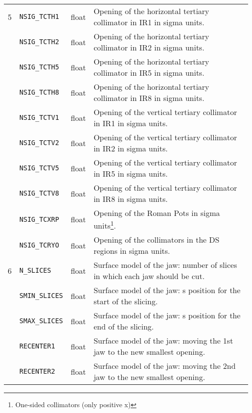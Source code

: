 \begin{center}
\begin{longtable}{| p{0.5cm} | p{2.4cm} | p{1.2cm} | >{\raggedright\arraybackslash}p{11.4cm}|}
    5   & \texttt{NSIG\_TCTH1}   & float   & Opening of the horizontal tertiary collimator in IR1 in sigma units\index{tertiary collimator}. \\
        \cline{2-4}
        & \texttt{NSIG\_TCTH2}   & float   & Opening of the horizontal tertiary collimator in IR2 in sigma units\index{tertiary collimator}. \\
        \cline{2-4}
        & \texttt{NSIG\_TCTH5}   & float   & Opening of the horizontal tertiary collimator in IR5 in sigma units\index{tertiary collimator}. \\
        \cline{2-4}
        & \texttt{NSIG\_TCTH8}   & float   & Opening of the horizontal tertiary collimator in IR8 in sigma units\index{tertiary collimator}. \\
        \cline{2-4}
        & \texttt{NSIG\_TCTV1}   & float   & Opening of the vertical tertiary collimator in IR1 in sigma units\index{tertiary collimator}. \\
        \cline{2-4}
        & \texttt{NSIG\_TCTV2}   & float   & Opening of the vertical tertiary collimator in IR2 in sigma units\index{tertiary collimator}. \\
        \cline{2-4}
        & \texttt{NSIG\_TCTV5}   & float   & Opening of the vertical tertiary collimator in IR5 in sigma units\index{tertiary collimator}. \\
        \cline{2-4}
        & \texttt{NSIG\_TCTV8}   & float   & Opening of the vertical tertiary collimator in IR8 in sigma units\index{tertiary collimator}. \\
        \cline{2-4}
        & \texttt{NSIG\_TCXRP}   & float   & Opening of the Roman Pots in sigma units\footnote{One-sided collimators (only positive x)}. \\
        \cline{2-4}
        & \texttt{NSIG\_TCRYO}   & float   & Opening of the collimators in the DS regions in sigma units. \\
    \hline

    6   & \texttt{N\_SLICES}     & float   & Surface model of the jaw: number of slices in which each jaw should be cut. \\
        \cline{2-4}
        & \texttt{SMIN\_SLICES}  & float   & Surface model of the jaw: s position for the start of the slicing. \\
        \cline{2-4}
        & \texttt{SMAX\_SLICES}  & float   & Surface model of the jaw: s position for the end of the slicing. \\
        \cline{2-4}
        & \texttt{RECENTER1}     & float   & Surface model of the jaw: moving the 1st jaw to the new smallest opening. \\
        \cline{2-4}
        & \texttt{RECENTER2}     & float   & Surface model of the jaw: moving the 2nd jaw to the new smallest opening. \\
    \hline


\end{longtable}
\end{center}
